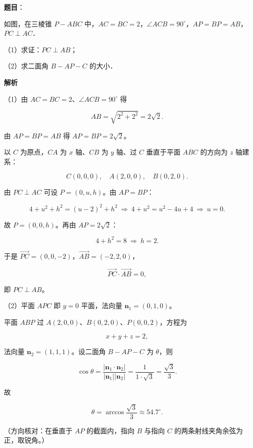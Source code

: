 \begin{answer}

\textbf{题目}：

如图，在三棱锥 $P-ABC$ 中，$AC=BC=2$，$\angle ACB=90^\circ$，$AP=BP=AB$，$PC\perp AC$．
\nopagebreak[4]
\begin{center}\end{center}
\nopagebreak[4]
（1）求证：$PC\perp AB$；

（2）求二面角 $B-AP-C$ 的大小．

\textbf{解析}

（1）由 $AC=BC=2$、$\angle ACB=90^\circ$ 得

\nopagebreak[4]
\[AB=\sqrt{2^2+2^2}=2\sqrt2 .\]

由 $AP=BP=AB$ 得 $AP=BP=2\sqrt2$。

以 $C$ 为原点，$CA$ 为 $x$ 轴、$CB$ 为 $y$ 轴、过 $C$ 垂直于平面 $ABC$ 的方向为 $z$ 轴建系：

\nopagebreak[4]
\[C(0,0,0),\quad A(2,0,0),\quad B(0,2,0).\]

由 $PC\perp AC$ 可设 $P=(0,u,h)$。由 $AP=BP$：

\nopagebreak[4]
\[4+u^2+h^2=(u-2)^2+h^2\ \Longrightarrow\ 4+u^2=u^2-4u+4\ \Longrightarrow\ u=0 .\]

故 $P=(0,0,h)$。再由 $AP=2\sqrt2$：

\nopagebreak[4]
\[4+h^2=8\ \Longrightarrow\ h=2 .\]

于是 $\overrightarrow{PC}=(0,0,-2)$，$\overrightarrow{AB}=(-2,2,0)$，

\nopagebreak[4]
\[\overrightarrow{PC}\cdot\overrightarrow{AB}=0,\]

即 $PC\perp AB$。

（2）平面 $APC$ 即 $y=0$ 平面，法向量 $\mathbf n_1=(0,1,0)$。

平面 $ABP$ 过 $A(2,0,0)$、$B(0,2,0)$、$P(0,0,2)$，方程为

\nopagebreak[4]
\[x+y+z=2,\]

法向量 $\mathbf n_2=(1,1,1)$。设二面角 $B-AP-C$ 为 $\theta$，则

\nopagebreak[4]
\[\cos\theta=\frac{|\mathbf n_1\cdot\mathbf n_2|}{|\mathbf n_1||\mathbf n_2|}=\frac{1}{1\cdot\sqrt3}=\frac{\sqrt3}{3}.\]

故

\nopagebreak[4]
\[\theta=\arccos\frac{\sqrt3}{3}\approx54.7^\circ .\]

（方向核对：在垂直于 $AP$ 的截面内，指向 $B$ 与指向 $C$ 的两条射线夹角余弦为正，取锐角。）


\end{answer}
